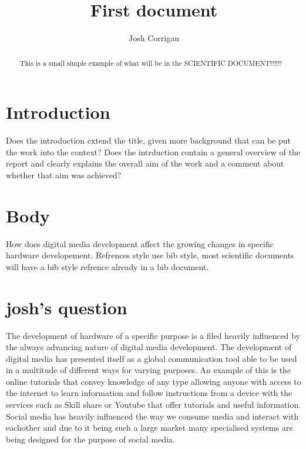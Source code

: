 \documentclass[12pt, times new roman]{article}
\title{\textbf{First document}}
\author{Josh Corrigan}
\begin{document}
\maketitle
\begin{abstract}
This is a small simple example of what will be in the SCIENTIFIC DOCUMENT!!!!!!
\end{abstract}
\section{Introduction}
	Does the introduction extend the title, given more background that can be put the work into the context? \newline
	Does the intrduction contain a general overview of the report and clearly explains the overall aim of the work and a comment about whether that aim was achieved?
\section{Body}
	How does digital media development affect the growing changes in specific hardware developement. \newline
	Refrences style use bib style, most scientific documents will have a bib style refrence already in a bib document.
\newline
\newline
\newline
\newline
\section{josh's question}
The development of hardware of a specific purpose is a filed heavily influenced by the always advancing nature of digital media development. The development of digital media has presented itself as a global communication tool able to be used in a multitude of different ways for varying purposes. An example of this is the online tutorials that convey knowledge of any type allowing anyone with access to the internet to learn information and follow instructions from a device with the services such as Skill share or Youtube that offer tutorials and useful information. Social media has heavily influenced the way we consume media and interact with eachother and due to it being such a large market many specialised systems are being designed for the purpose of social media. \newline
\end{document}
